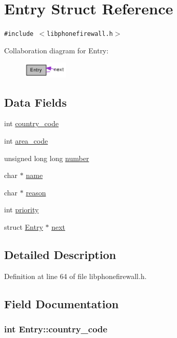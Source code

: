 \hypertarget{structEntry}{
\section{Entry Struct Reference}
\label{structEntry}
}
{\tt \#include $<$libphonefirewall.h$>$}

Collaboration diagram for Entry:\nopagebreak
\begin{figure}[H]
\begin{center}
\leavevmode
\includegraphics[width=61pt]{structEntry__coll__graph}
\end{center}
\end{figure}
\subsection*{Data Fields}
\begin{CompactItemize}
\item 
int \hyperlink{structEntry_138b4e79687ff5ff6de4554db0f061fd}{country\_\-code}
\item 
int \hyperlink{structEntry_9de7b96e5b65796bd35e9dc730dcd8b3}{area\_\-code}
\item 
unsigned long long \hyperlink{structEntry_1f2177afed89936f82c130ae13fb107c}{number}
\item 
char $\ast$ \hyperlink{structEntry_272e382d3efed5f970c7939742ec9603}{name}
\item 
char $\ast$ \hyperlink{structEntry_2082cdbb815dfa8b81309cd395d32986}{reason}
\item 
int \hyperlink{structEntry_85af261b3171c257892b54a7200da061}{priority}
\item 
struct \hyperlink{structEntry}{Entry} $\ast$ \hyperlink{structEntry_08cba741f383cd7da0f3ab9aee6e3cd5}{next}
\end{CompactItemize}


\subsection{Detailed Description}


Definition at line 64 of file libphonefirewall.h.

\subsection{Field Documentation}
\hypertarget{structEntry_138b4e79687ff5ff6de4554db0f061fd}{
\subsubsection{\setlength{\rightskip}{0pt plus 5cm}int {\bf Entry::country\_\-code}}}
\label{structEntry_138b4e79687ff5ff6de4554db0f061fd}





